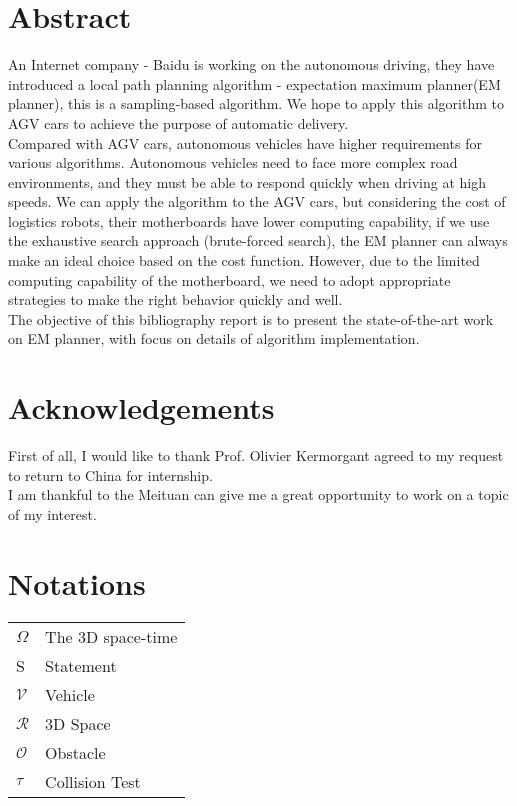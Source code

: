 \documentclass{thesisreport}
\begin{document}
   
 
  \section*{Abstract}
\par An Internet company - Baidu is working on the autonomous driving, they have introduced a local path planning algorithm - expectation maximum planner(EM planner), this is a sampling-based algorithm. We hope to apply this algorithm to AGV cars to achieve the purpose of automatic delivery.\\
\indent
Compared with AGV cars, autonomous vehicles have higher requirements for various algorithms. Autonomous vehicles need to face more complex road environments, and they must be able to respond quickly when driving at high speeds.
We can apply the algorithm to the AGV cars, but considering the cost of logistics robots, their motherboards have lower computing capability, if we use the exhaustive search approach (brute-forced search), the EM planner can always make an ideal choice based on the cost function. However, due to the limited computing capability of the motherboard, we need to adopt appropriate strategies to make the right behavior quickly and well.\\
\indent
The objective of this bibliography report is to present the state-of-the-art work on EM planner, with focus on details of algorithm implementation.


 \newpage
 
 \section*{Acknowledgements}
 First of all, I would like to thank Prof. Olivier Kermorgant agreed to my request to return to China for internship. \\
 \indent
 I am thankful to the Meituan can give me a great opportunity to work on a topic of my interest.
 
 \newpage
 
 \section*{Notations}
 \begin{tabular}{ll}
 $\Omega$ & The 3D space-time\\
  S & Statement\\
 $\mathcal V$ & Vehicle\\
 $\mathcal R$ & 3D Space\\
 $\mathcal O$ & Obstacle\\
 $\tau$ & Collision Test
 \end{tabular}
  \newpage
\end{document}
